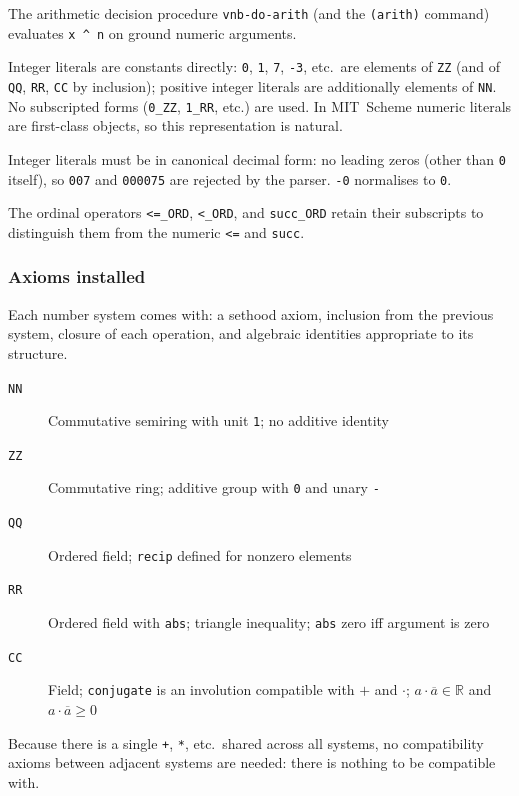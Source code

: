 \documentclass{amsbook}[openany]
\theoremstyle{definition}
\theoremstyle{remark}
\theoremstyle{remark}
\begin{document}
The arithmetic decision procedure \texttt{vnb-do-arith} (and the
\texttt{(arith)} command) evaluates \texttt{x \^{} n} on ground
numeric arguments.

\noindent
Integer literals are constants directly: \texttt{0}, \texttt{1},
\texttt{7}, \texttt{-3}, etc.\ are elements of \texttt{ZZ} (and of
\texttt{QQ}, \texttt{RR}, \texttt{CC} by inclusion); positive integer
literals are additionally elements of \texttt{NN}.  No subscripted
forms (\texttt{0\_ZZ}, \texttt{1\_RR}, etc.) are used.  In MIT~Scheme
numeric literals are first-class objects, so this representation is
natural.

Integer literals must be in canonical decimal form: no leading zeros
(other than \texttt{0} itself), so \texttt{007} and \texttt{000075} are
rejected by the parser.  \texttt{-0} normalises to \texttt{0}.

The ordinal operators \texttt{<=\_ORD}, \texttt{<\_ORD}, and
\texttt{succ\_ORD} retain their subscripts to distinguish them from the
numeric \texttt{<=} and \texttt{succ}.

\subsubsection{Axioms installed}

Each number system comes with: a sethood axiom, inclusion from the
previous system, closure of each operation, and algebraic identities
appropriate to its structure.

\begin{description}
\item[\texttt{NN}] Commutative semiring with unit \texttt{1}; no additive identity
\item[\texttt{ZZ}] Commutative ring; additive group with \texttt{0} and unary \texttt{-}
\item[\texttt{QQ}] Ordered field; \texttt{recip} defined for nonzero elements
\item[\texttt{RR}] Ordered field with \texttt{abs}; triangle inequality; \texttt{abs} zero iff argument is zero
\item[\texttt{CC}] Field; \texttt{conjugate} is an involution compatible with $+$ and $\cdot$;
  $a \cdot \overline{a} \in \mathbb{R}$ and $a \cdot \overline{a} \geq 0$
\end{description}

Because there is a single \texttt{+}, \texttt{*}, etc.\ shared across all
systems, no compatibility axioms between adjacent systems are needed:
there is nothing to be compatible with.
\end{document}
